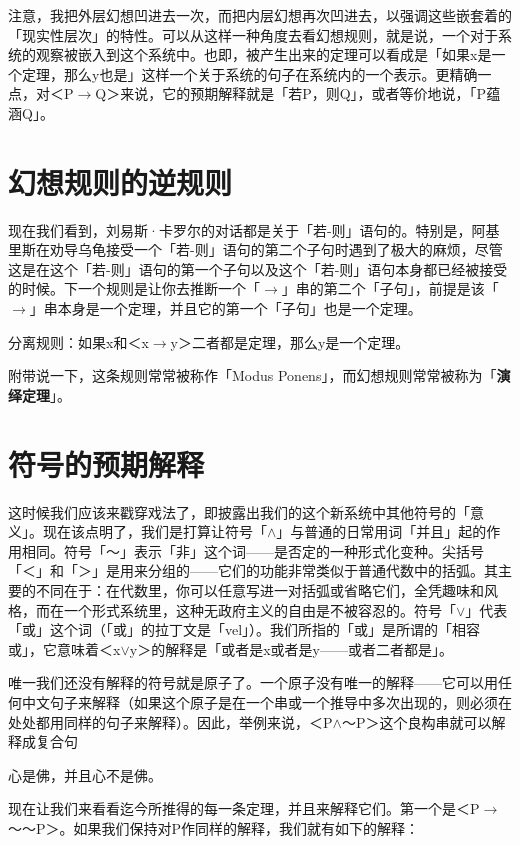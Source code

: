 \documentclass[
  12pt,
  twoside,
  openright,
  oldfontcommands,
]{memoir}
\newcommand{\heititext}[1]{{\heifamily\bfseries #1}}
\begin{document}
注意，我把外层幻想凹进去一次，而把内层幻想再次凹进去，以强调这些嵌套着的「现实性层次」的特性。可以从这样一种角度去看幻想规则，就是说，一个对于系统的观察被嵌入到这个系统中。也即，被产生出来的定理可以看成是「如果x是一个定理，那么y也是」这样一个关于系统的句子在系统内的一个表示。更精确一点，对＜P$\rightarrow$Q＞来说，它的预期解释就是「若P，则Q」，或者等价地说，「P蕴涵Q」。

\section{幻想规则的逆规则}

现在我们看到，刘易斯·卡罗尔的对话都是关于「若-则」语句的。特别是，阿基里斯在劝导乌龟接受一个「若-则」语句的第二个子句时遇到了极大的麻烦，尽管这是在这个「若-则」语句的第一个子句以及这个「若-则」语句本身都已经被接受的时候。下一个规则是让你去推断一个「$\rightarrow$」串的第二个「子句」，前提是该「$\rightarrow$」串本身是一个定理，并且它的第一个「子句」也是一个定理。

分离规则：如果x和＜x$\rightarrow$y＞二者都是定理，那么y是一个定理。

附带说一下，这条规则常常被称作「Modus
Ponens」，而幻想规则常常被称为「\heititext{演绎定理}」。

\section{符号的预期解释}

这时候我们应该来戳穿戏法了，即披露出我们的这个新系统中其他符号的「意义」。现在该点明了，我们是打算让符号「$\wedge$」与普通的日常用词「并且」起的作用相同。符号「～」表示「非」这个词------是否定的一种形式化变种。尖括号「＜」和「＞」是用来分组的------它们的功能非常类似于普通代数中的括弧。其主要的不同在于：在代数里，你可以任意写进一对括弧或省略它们，全凭趣味和风格，而在一个形式系统里，这种无政府主义的自由是不被容忍的。符号「$\vee$」代表「或」这个词（「或」的拉丁文是「vel」）。我们所指的「或」是所谓的「相容或」，它意味着＜x$\vee$y＞的解释是「或者是x或者是y------或者二者都是」。

唯一我们还没有解释的符号就是原子了。一个原子没有唯一的解释------它可以用任何中文句子来解释（如果这个原子是在一个串或一个推导中多次出现的，则必须在处处都用同样的句子来解释）。因此，举例来说，＜P$\wedge$～P＞这个良构串就可以解释成复合句

心是佛，并且心不是佛。

现在让我们来看看迄今所推得的每一条定理，并且来解释它们。第一个是＜P$\rightarrow$～～P＞。如果我们保持对P作同样的解释，我们就有如下的解释：
\end{document}
